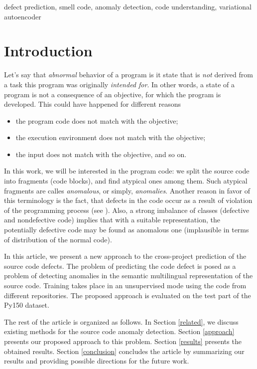 \documentclass[conference]{ieeetran}
\begin{document}
\begin{IEEEkeywords}
defect prediction, smell code, anomaly detection, code understanding, variational autoencoder
\end{IEEEkeywords}


\section{Introduction}\label{intro}

Let's say that {\it abnormal} behavior of a program is it state that is {\it not} derived
 from a task this program was originally {\it intended for}.
In other words, a state of a program is not a consequence of an objective, for which the program is developed.
This could have happened for different reasons
\begin{itemize}
\item the program code does not match with the objective;
\item the execution environment does not match with the objective;
\item the input does not match with the objective, and so on.
\end{itemize}
In this work, we will be interested in the program code:
 we split the source code into fragments (code blocks), and find atypical ones among them.
Such atypical fragments are calles  {\it anomalous}, or simply, {\it anomalies}.
Another reason in favor of this terminology is the fact,
 that defects in the code occur as a result of violation of the programming process (see \cite{AfricEtAl2020}).
Also, a strong imbalance of classes (defective and nondefective code) implies that with a suitable representation,
 the potentially defective code may be found as anomalous one (implausible in terms of distribution of the normal code).

In this article, we present a new approach to the cross-project prediction of the source code defects.
The problem of predicting the code defect is posed as a problem of detecting anomalies
 in the semantic multilingual representation of the source code.
Training takes place in an unsupervised mode using the code from different repositories.
The proposed approach is evaluated on the test part of the Py150 dataset.

The rest of the article is organized as follows.
In Section \ref{related}, we discuss existing methods for the source code anomaly detection.
Section \ref{approach} presents our proposed approach to this problem.
Section \ref{results} presents the obtained results.
Section \ref{conclusion} concludes the article by summarizing our results and providing possible directions for the future work.
\end{document}
